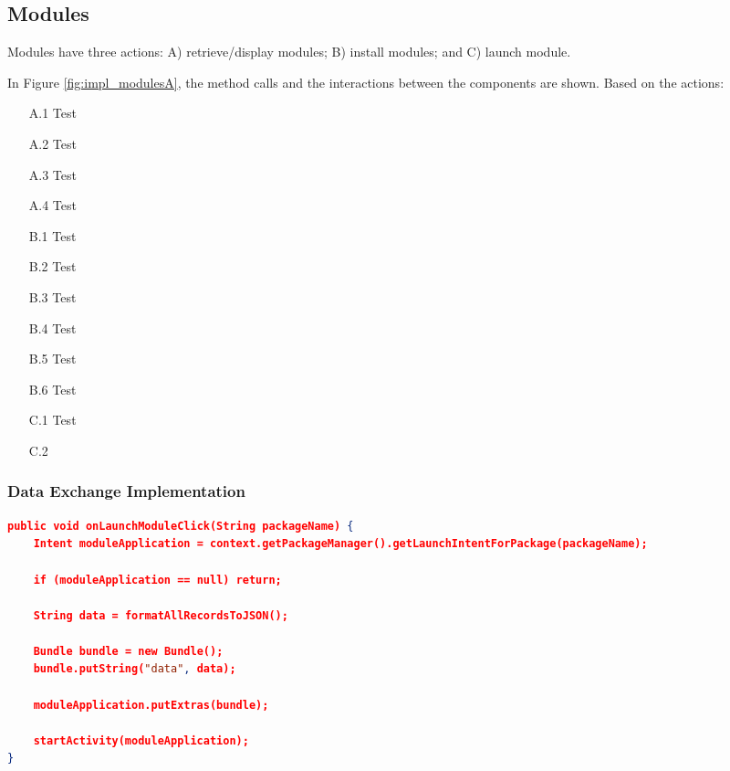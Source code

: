 \subsection{Modules}
Modules have three actions: A) retrieve/display modules; B) install modules; and C) launch module. 

In Figure \ref{fig:impl_modulesA}, the method calls and the interactions between the components are shown.  Based on the actions: 

\begin{itemize}
    \item[A.1] Test
    \item[A.2] Test
    \item[A.3] Test
    \item[A.4] Test
    \item[B.1] Test
    \item[B.2] Test
    \item[B.3] Test
    \item[B.4] Test
    \item[B.5] Test
    \item[B.6] Test
    \item[C.1] Test 
    \item[C.2]     
\end{itemize}




\subsubsection{Data Exchange Implementation}
\begin{lstlisting}[language=json, caption={My Caption}, captionpos=b]
public void onLaunchModuleClick(String packageName) {
    Intent moduleApplication = context.getPackageManager().getLaunchIntentForPackage(packageName);
    
    if (moduleApplication == null) return;

    String data = formatAllRecordsToJSON();

    Bundle bundle = new Bundle();
    bundle.putString("data", data);

    moduleApplication.putExtras(bundle);

    startActivity(moduleApplication);
}

\end{lstlisting}

